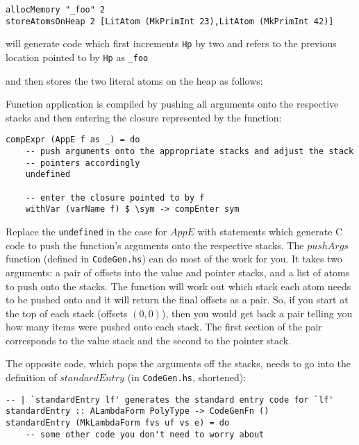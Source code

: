 \documentclass[10pt,a4paper]{exam} %
\begin{document}
\begin{questions}
\begin{parts}
\begin{itemize}
\begin{verbatim}
allocMemory "_foo" 2
storeAtomsOnHeap 2 [LitAtom (MkPrimInt 23),LitAtom (MkPrimInt 42)]
\end{verbatim}
will generate code which first increments \texttt{Hp} by two and refers to the previous location pointed to by \texttt{Hp} as \texttt{\_foo}
\begin{center}
\begin{drawstack}
  \cell{} 
  \cell{}
  \cell{} 
\end{drawstack}
\end{center}
and then stores the two literal atoms on the heap as follows:
\begin{center}
\begin{drawstack}
   
  \cell{} 
\end{drawstack}
\end{center}
\end{itemize}
\end{parts}

\question Function application is compiled by pushing all arguments onto the respective stacks and then entering the closure represented by the function:
\begin{verbatim}
compExpr (AppE f as _) = do
    -- push arguments onto the appropriate stacks and adjust the stack
    -- pointers accordingly
    undefined

    -- enter the closure pointed to by f
    withVar (varName f) $ \sym -> compEnter sym
\end{verbatim}
Replace the \texttt{undefined} in the case for $\mathit{AppE}$ with statements which generate C code to push the function's arguments onto the respective stacks. The $\mathit{pushArgs}$ function (defined in \texttt{CodeGen.hs}) can do most of the work for you. It takes two arguments: a pair of offsets into the value and pointer stacks, and a list of atoms to push onto the stacks. The function will work out which stack each atom needs to be pushed onto and it will return the final offsets as a pair. So, if you start at the top of each stack (offsets $(0,0)$), then you would get back a pair telling you how many items were pushed onto each stack. The first section of the pair corresponds to the value stack and the second to the pointer stack.

\question The opposite code, which pops the arguments off the stacks, needs to go into the definition of $\mathit{standardEntry}$ (in \texttt{CodeGen.hs}, shortened):
\begin{verbatim}
-- | `standardEntry lf' generates the standard entry code for `lf'
standardEntry :: ALambdaForm PolyType -> CodeGenFn ()
standardEntry (MkLambdaForm fvs uf vs e) = do
    -- some other code you don't need to worry about
    

\end{verbatim}
\end{questions}
\end{document}

